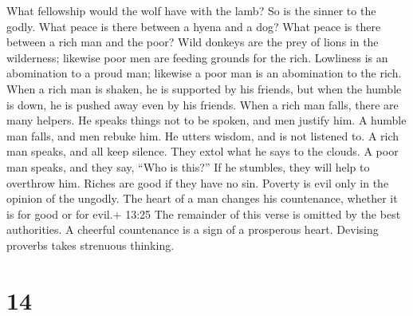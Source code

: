 What fellowship would the wolf have with the lamb? So is the sinner to
the godly.  What peace is there between a hyena and a dog?
What peace is there between a rich man and the poor?  Wild
donkeys are the prey of lions in the wilderness; likewise poor men are
feeding grounds for the rich.  Lowliness is an abomination
to a proud man; likewise a poor man is an abomination to the rich.
 When a rich man is shaken, he is supported by his friends,
but when the humble is down, he is pushed away even by his friends.
 When a rich man falls, there are many helpers. He speaks
things not to be spoken, and men justify him. A humble man falls, and
men rebuke him. He utters wisdom, and is not listened to. 
A rich man speaks, and all keep silence. They extol what he says to the
clouds. A poor man speaks, and they say, ``Who is this?'' If he
stumbles, they will help to overthrow him.  Riches are good
if they have no sin. Poverty is evil only in the opinion of the ungodly.
 The heart of a man changes his countenance, whether it is
for good or for evil.+ 13:25 The remainder of this verse is omitted by
the best authorities.  A cheerful countenance is a sign of
a prosperous heart. Devising proverbs takes strenuous thinking.

\hypertarget{section-3}{%
\section{14}\label{section-3}}

